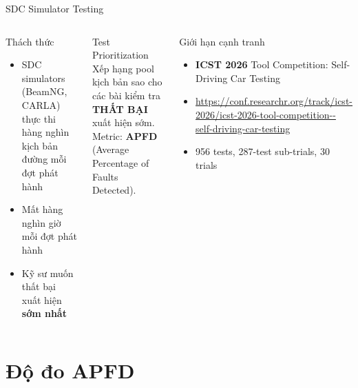 \documentclass[aspectratio=169,10pt]{beamer}
\begin{document}
\begin{frame}{SDC Simulator Testing}
\begin{columns}[T]
\begin{block}{Thách thức}
\scriptsize
\begin{itemize}
  \item SDC simulators (BeamNG, CARLA) thực thi hàng nghìn kịch bản đường mỗi đợt phát hành
  \item Mất hàng nghìn giờ mỗi đợt phát hành
  \item Kỹ sư muốn thất bại xuất hiện \textbf{sớm nhất}
\end{itemize}
\end{block}

\vspace{0.4em}
\begin{exampleblock}{Test Prioritization}
\scriptsize
Xếp hạng pool kịch bản sao cho các bài kiểm tra \textbf{THẤT BẠI} xuất hiện sớm.\\
Metric: \textbf{APFD} (Average Percentage of Faults Detected).
\end{exampleblock}

\begin{block}{Giới hạn cạnh tranh}
\scriptsize
\begin{itemize}
  \item \textbf{ICST 2026} Tool Competition: Self-Driving Car Testing
  \item \url{https://conf.researchr.org/track/icst-2026/icst-2026-tool-competition--self-driving-car-testing}
  \item 956 tests, 287-test sub-trials, 30 trials
\end{itemize}
\end{block}
\end{columns}
\end{frame}

\section{Độ đo APFD}
\end{document}
